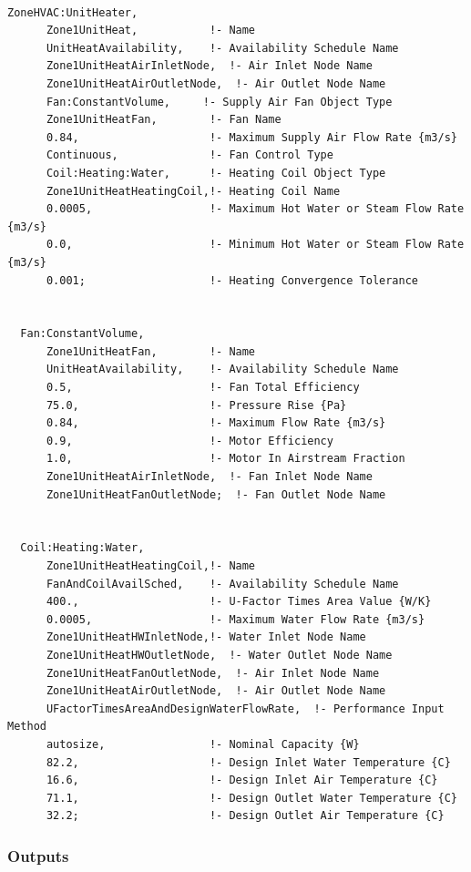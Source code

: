 \begin{lstlisting}

ZoneHVAC:UnitHeater,
      Zone1UnitHeat,           !- Name
      UnitHeatAvailability,    !- Availability Schedule Name
      Zone1UnitHeatAirInletNode,  !- Air Inlet Node Name
      Zone1UnitHeatAirOutletNode,  !- Air Outlet Node Name
      Fan:ConstantVolume,     !- Supply Air Fan Object Type
      Zone1UnitHeatFan,        !- Fan Name
      0.84,                    !- Maximum Supply Air Flow Rate {m3/s}
      Continuous,              !- Fan Control Type
      Coil:Heating:Water,      !- Heating Coil Object Type
      Zone1UnitHeatHeatingCoil,!- Heating Coil Name
      0.0005,                  !- Maximum Hot Water or Steam Flow Rate {m3/s}
      0.0,                     !- Minimum Hot Water or Steam Flow Rate {m3/s}
      0.001;                   !- Heating Convergence Tolerance


  Fan:ConstantVolume,
      Zone1UnitHeatFan,        !- Name
      UnitHeatAvailability,    !- Availability Schedule Name
      0.5,                     !- Fan Total Efficiency
      75.0,                    !- Pressure Rise {Pa}
      0.84,                    !- Maximum Flow Rate {m3/s}
      0.9,                     !- Motor Efficiency
      1.0,                     !- Motor In Airstream Fraction
      Zone1UnitHeatAirInletNode,  !- Fan Inlet Node Name
      Zone1UnitHeatFanOutletNode;  !- Fan Outlet Node Name


  Coil:Heating:Water,
      Zone1UnitHeatHeatingCoil,!- Name
      FanAndCoilAvailSched,    !- Availability Schedule Name
      400.,                    !- U-Factor Times Area Value {W/K}
      0.0005,                  !- Maximum Water Flow Rate {m3/s}
      Zone1UnitHeatHWInletNode,!- Water Inlet Node Name
      Zone1UnitHeatHWOutletNode,  !- Water Outlet Node Name
      Zone1UnitHeatFanOutletNode,  !- Air Inlet Node Name
      Zone1UnitHeatAirOutletNode,  !- Air Outlet Node Name
      UFactorTimesAreaAndDesignWaterFlowRate,  !- Performance Input Method
      autosize,                !- Nominal Capacity {W}
      82.2,                    !- Design Inlet Water Temperature {C}
      16.6,                    !- Design Inlet Air Temperature {C}
      71.1,                    !- Design Outlet Water Temperature {C}
      32.2;                    !- Design Outlet Air Temperature {C}
\end{lstlisting}

\subsubsection{Outputs}\label{outputs-3-025}

